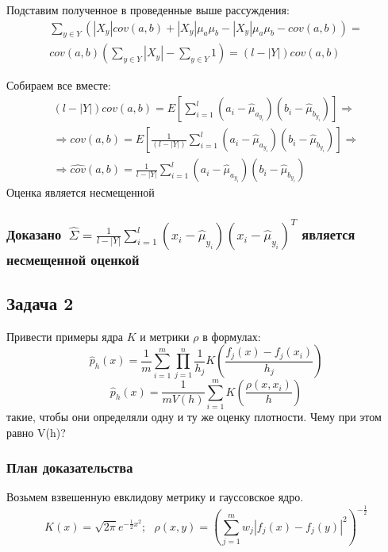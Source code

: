 \documentclass[12pt]{article}
\begin{document}
Подставим полученное в проведенные выше рассуждения:
\begin{align*}
    \sum_{y \in Y} \left(|X_y| cov(a, b) + |X_y| \mu_a \mu_b - |X_y| \mu_a \mu_b - cov(a, b)\right) = \\
    cov(a,b) \left(\sum_{y \in Y}|X_y| - \sum_{y \in Y} 1\right) = (l - |Y|) cov(a, b)
\end{align*}

Собираем все вместе:
\begin{align*}
    (l - |Y|) cov(a, b) = E\left[\sum_{i = 1}^{l}(a_i - \hat{\mu}_{a_{y_i}}) (b_i - \hat{\mu}_{b_{y_i}})\right] \Rightarrow \\
    \Rightarrow cov(a, b) = E\left[\frac{1}{(l - |Y|)} \sum_{i = 1}^{l}(a_i - \hat{\mu}_{a_{y_i}}) (b_i - \hat{\mu}_{b_{y_i}})\right] \Rightarrow \\
    \Rightarrow \hat{cov}(a, b) = \frac{1}{l - |Y|} \sum_{i = 1}^{l}(a_i - \hat{\mu}_{a_{y_i}}) (b_i - \hat{\mu}_{b_{y_i}})
\end{align*}
Оценка является несмещенной

\subsubsection*{Доказано~$\hat{\Sigma} = \frac{1}{l - |Y|} \sum_{i=1}^{l}(x_i - \hat{\mu}_{y_i}) (x_i - \hat{\mu}_{y_i})^{T}$ является несмещенной оценкой}

\subsection*{Задача 2}
Привести примеры ядра $ K $ и метрики $ \rho $ в формулах:
$$
    \hat{p}_h(x) = \frac{1}{m}\sum_{i = 1}^{m} \prod_{j = 1}^{n} \frac{1}{h_j} K\left(\frac{f_j(x) - f_j(x_i)}{h_j}\right)
$$
$$
    \hat{p}_h(x) = \frac{1}{m V(h)}\sum_{i = 1}^{m} K\left(\frac{\rho(x,x_i)}{h}\right)
$$
такие, чтобы они определяли одну и ту же оценку плотности. Чему при этом равно V(h)?

\subsubsection*{План доказательства}
Возьмем взвешенную евклидову метрику и гауссовское ядро.
$$
    K(x) = \sqrt{2 \pi} e^{-\frac{1}{2} x^2}; \mbox{        }
    \rho(x, y) = \left(\sum_{j = 1}^{m} w_j |f_j(x) - f_j(y)|^2\right)^{-\frac{1}{2}}
$$
\end{document}
